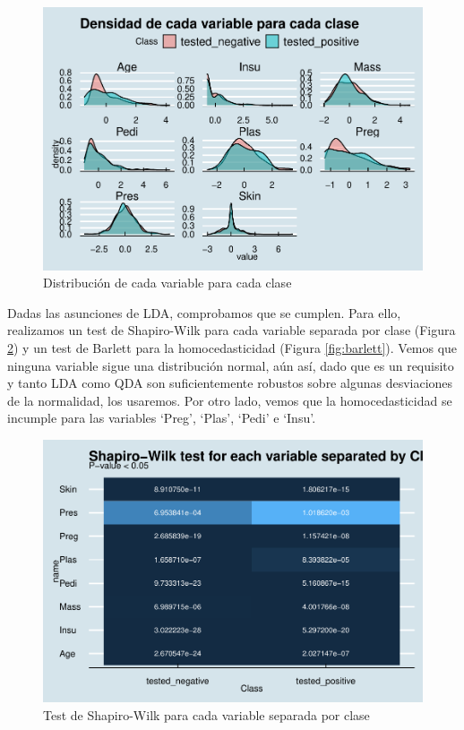 \documentclass[
]{article}
\begin{document}
\begin{figure}

{\centering \includegraphics[width=0.75\linewidth]{pima-clasificacion_files/figure-latex/multi_norm_density-1} 

}

\caption{Distribución de cada variable para cada clase}\label{fig:multi_norm_density}
\end{figure}

Dadas las asunciones de LDA, comprobamos que se cumplen. Para ello,
realizamos un test de Shapiro-Wilk para cada variable separada por clase
(Figura \ref{fig:shapiro}) y un test de Barlett para la homocedasticidad
(Figura \ref{fig:barlett}). Vemos que ninguna variable sigue una
distribución normal, aún así, dado que es un requisito y tanto LDA como
QDA son suficientemente robustos sobre algunas desviaciones de la
normalidad, los usaremos. Por otro lado, vemos que la homocedasticidad
se incumple para las variables `Preg', `Plas', `Pedi' e `Insu'.

\begin{figure}

{\centering \includegraphics[width=0.75\linewidth]{pima-clasificacion_files/figure-latex/shapiro-1} 

}

\caption{Test de Shapiro-Wilk para cada variable separada por clase}\label{fig:shapiro}
\end{figure}
\end{document}
